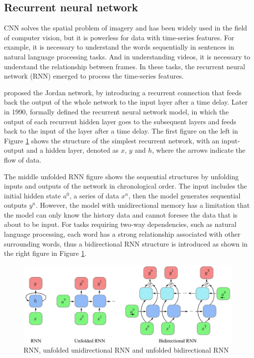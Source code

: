 \subsection{Recurrent neural network} %
CNN solves the spatial problem of imagery and has been widely used in the field of computer vision, but it is powerless for data with time-series features.
For example, it is necessary to understand the words sequentially in sentences in natural language processing tasks.
And in understanding videos, it is necessary to understand the relationship between frames.
In these tasks, the recurrent neural network (RNN) emerged to process the time-series features.

\citet{jordan1986serial} proposed the Jordan network, by introducing a recurrent connection that feeds back the output of the whole network to the input layer after a time delay.
Later in 1990, \citet{elman1990finding} formally defined the recurrent neural network model, in which the output of each recurrent hidden layer goes to the subsequent layers and feeds back to the input of the layer after a time delay.
The first figure on the left in Figure \ref{fig:2-RNN-unfold} shows the structure of the simplest recurrent network, with an input-output and a hidden layer, denoted as $x$, $y$ and $h$, where the arrows indicate the flow of data.

The middle unfolded RNN figure shows the sequential structures by unfolding inputs and outputs of the network in chronological order. 
The input includes the initial hidden state $a^0$, a series of data $x^n$, then the model generates sequential outputs $y^n$. However, the model with unidirectional memory has a limitation that the model can only know the history data and cannot foresee the data that is about to be input.
For tasks requiring two-way dependencies, such as natural language processing, each word has a strong relationship associated with other surrounding words, thus a bidirectional RNN structure is introduced as shown in the right figure in Figure \ref{fig:2-RNN-unfold}.

\begin{figure}[ht!]
    \centering
    \includegraphics[width=\textwidth]{literature/imgs/2-RNN-unfold.pdf}
    \caption{RNN, unfolded unidirectional RNN and unfolded bidirectional RNN}
    \label{fig:2-RNN-unfold}
\end{figure}


